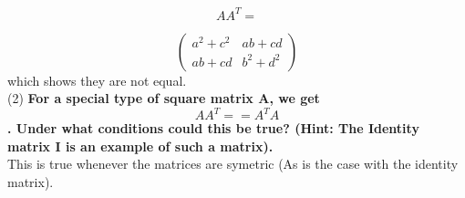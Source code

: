 \documentclass{article}
\begin{document}
\[AA^{T} = \]

\[ \left( \begin{array}{ccc}
a^2+c^2 & ab+cd \\
ab+cd & b^2+d^2 \end{array} \right)\] 
which shows they are not equal. \\

(2) \textbf{For a special type of square matrix A, we get \[AA^{T} == A^{T}A \]
. Under what conditions could this be true? (Hint: The Identity matrix I is an example of such a matrix).} \\

This is true whenever the matrices are symetric (As is the case with the identity matrix).
\end{document}
